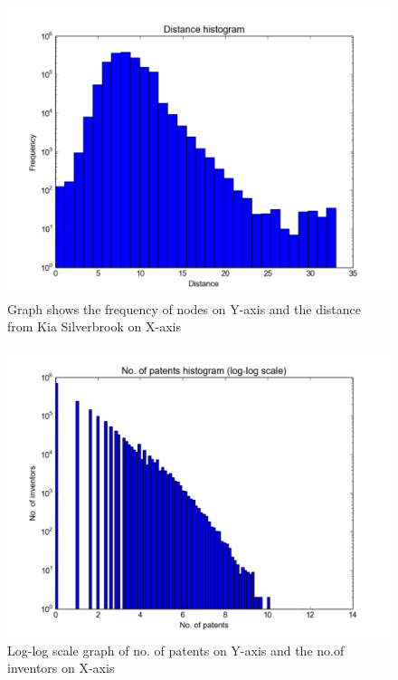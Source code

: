 \begin{figure}[t]
  \includegraphics[scale=0.425]{figure/silver_brook_distance.pdf}
  \caption{ Graph shows the frequency of nodes on Y-axis and the distance from
Kia Silverbrook on X-axis }
\label{fig:distance}
\end{figure}

\begin{figure}
  \includegraphics[scale=0.425]{figure/silver_log_log.pdf}
  \caption{ Log-log scale graph of no. of patents on Y-axis and the no.of inventors on X-axis}
\label{fig:patent}	
\end{figure}

